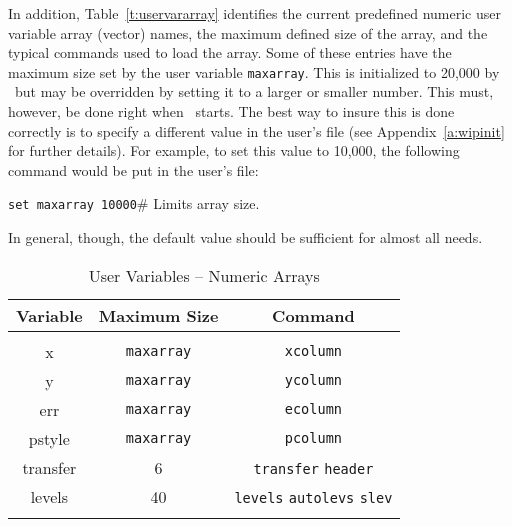 In addition,
Table~\ref{t:uservararray}
identifies the current predefined numeric user variable array (vector) names,
the maximum defined size of the array, and the typical commands used to load
the array.
Some of these entries have the maximum size set by the user variable
{\tt maxarray}.
This is initialized to 20,000 by \wip\ but may be overridden by setting
it to a larger or smaller number.
This must, however, be done right when \wip\ starts.
The best way to insure this is done correctly is to specify a different
value in the user's \wipinit{} file
(see Appendix~\ref{a:wipinit} for further details).
For example, to set this value to 10,000, the following command would be
put in the user's \wipinit{} file:
\begin{wiplist}%
  \item {\tt set maxarray 10000}\hfill\# Limits array size.
\end{wiplist}
In general, though, the default value should be sufficient for almost all
needs.
\begin{table}
  \caption{User Variables -- Numeric Arrays}
  \centering
  \begin{tabular}{|c|c|c|} \hline\hline
    \multicolumn{1}{|c}{Variable}
    & \multicolumn{1}{|c}{Maximum Size}
    & \multicolumn{1}{|c|}{Command} \\ \hline
    && \\
    x        & {\tt maxarray} & {\tt xcolumn} \\
    y        & {\tt maxarray} & {\tt ycolumn} \\
    err      & {\tt maxarray} & {\tt ecolumn} \\
    pstyle   & {\tt maxarray} & {\tt pcolumn} \\
    transfer &     6 & {\tt transfer} {\tt header} \\
    levels   &    40 & {\tt levels} {\tt autolevs} {\tt slev} \\
    && \\ \hline\hline
  \end{tabular}
\end{table}

